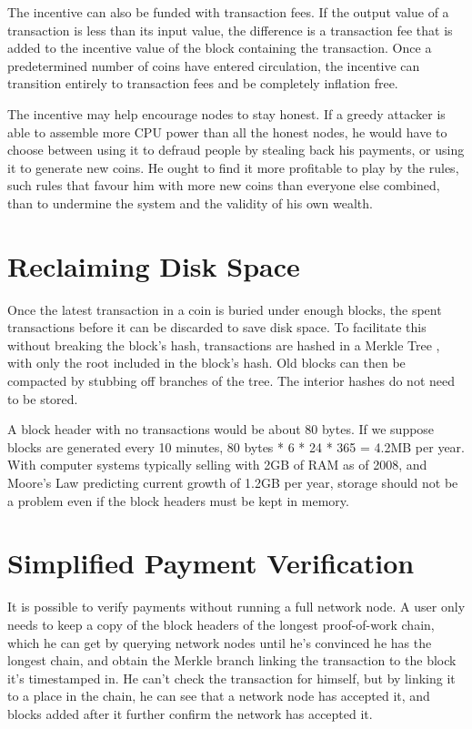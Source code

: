 \documentclass{article}
\begin{document}
The incentive can also be funded with transaction fees.
If the output value of a transaction is less than its input value, the difference is a transaction fee that is added to the incentive value of the block containing the transaction.
Once a predetermined number of coins have entered circulation, the incentive can transition entirely to transaction fees and be completely inflation free.

The incentive may help encourage nodes to stay honest.
If a greedy attacker is able to assemble more CPU power than all the honest nodes, he would have to choose between using it to defraud people by stealing back his payments, or using it to generate new coins.
He ought to find it more profitable to play by the rules, such rules that favour him with more new coins than everyone else combined, than to undermine the system and the validity of his own wealth.


\section{Reclaiming Disk Space}\label{sec:reclaiming-disk-space}
Once the latest transaction in a coin is buried under enough blocks, the spent transactions before it can be discarded to save disk space.
To facilitate this without breaking the block's hash, transactions are hashed in a Merkle Tree \cite{merkle1980protocols}\cite{massias1999design}\cite{haber1997secure}, with only the root included in the block's hash.
Old blocks can then be compacted by stubbing off branches of the tree.
The interior hashes do not need to be stored.
\begin{center}
\scalebox{0.75}
{}
\end{center}

A block header with no transactions would be about 80 bytes.
If we suppose blocks are generated every 10 minutes, 80 bytes * 6 * 24 * 365 = 4.2MB per year.
With computer systems typically selling with 2GB of RAM as of 2008, and Moore's Law predicting current growth of 1.2GB per year, storage should not be a problem even if the block headers must be kept in memory.


\section{Simplified Payment Verification}\label{sec:simplified-payment-verification}
It is possible to verify payments without running a full network node.
A user only needs to keep a copy of the block headers of the longest proof-of-work chain, which he can get by querying network nodes until he's convinced he has the longest chain, and obtain the Merkle branch linking the transaction to the block it's timestamped in.
He can't check the transaction for himself, but by linking it to a place in the chain, he can see that a network node has accepted it, and blocks added after it further confirm the network has accepted it.
\end{document}
